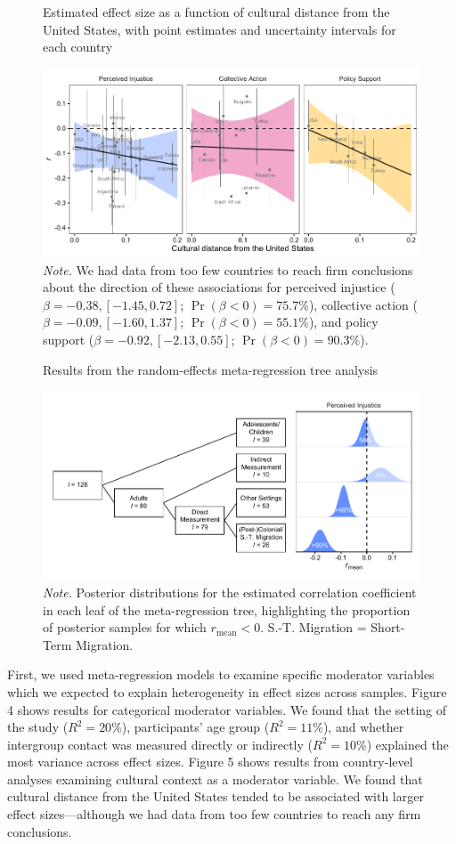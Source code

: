 \documentclass[12pt, letterpaper]{article}
\begin{document}
\begin{figure}
\centering
\caption{Estimated effect size as a function of cultural distance from the United States, with point estimates and uncertainty intervals for each country}
\includegraphics[scale=1]{../figures/figure-5}
\caption*{\textit{Note.} We had data from too few countries to reach firm conclusions about the direction of these associations for perceived injustice ($\beta = -0.38, [-1.45, 0.72]$; $\Pr (\beta < 0) = 75.7\%$), collective action ($\beta = -0.09, [-1.60, 1.37]$; $\Pr (\beta < 0) = 55.1\%$), and policy support ($\beta = -0.92, [-2.13, 0.55]$; $\Pr (\beta < 0) = 90.3\%$).}
\label{fig:f5}
\end{figure}
\begin{figure}
\centering
\caption{Results from the random-effects meta-regression tree analysis}
\includegraphics[scale=1]{../figures/figure-6}
\caption*{\textit{Note.} Posterior distributions for the estimated correlation coefficient in each leaf of the meta-regression tree, highlighting the proportion of posterior samples for which $r_\text{mean} < 0$.  S.-T. Migration = Short-Term Migration.}
\label{fig:f6}
\end{figure}

First, we used meta-regression models to examine specific moderator
variables which we expected to explain heterogeneity in effect sizes
across samples. Figure 4 shows results for categorical moderator
variables. We found that the setting of the study (\(R^2 = 20\%\)),
participants' age group (\(R^2 = 11\%\)), and whether intergroup contact
was measured directly or indirectly (\(R^2 = 10\%\)) explained the most
variance across effect sizes. Figure 5 shows results from country-level
analyses examining cultural context as a moderator variable. We found
that cultural distance from the United States tended to be associated
with larger effect sizes---although we had data from too few countries
to reach any firm conclusions.
\end{document}
